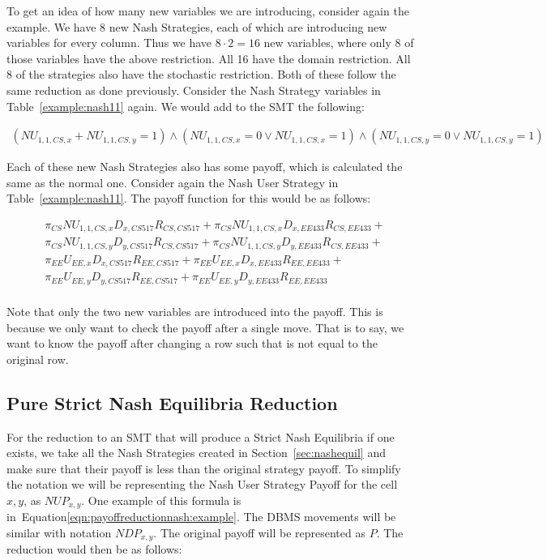 \documentclass{article}
\begin{document}
To get an idea of how many new variables we are introducing, consider again the example. We have 8 new Nash Strategies, each of which are introducing new variables for every column. Thus we have $8\cdot2=16$ new variables, where only 8 of those variables have the above restriction. All 16 have the domain restriction. All 8 of the strategies also have the stochastic restriction. Both of these follow the same reduction as done previously. Consider the Nash Strategy variables in Table~\ref{example:nash11} again. We would add to the SMT the following:

\begin{align}
(NU_{1,1,CS,x} + NU_{1,1,CS,y}=1)\land(NU_{1,1,CS,x}=0 \lor NU_{1,1,CS,x}=1)\land(NU_{1,1,CS,y}=0 \lor NU_{1,1,CS,y}=1)
\end{align}

Each of these new Nash Strategies also has some payoff, which is calculated the same as the normal one. Consider again the Nash User Strategy in Table~\ref{example:nash11}. The payoff function for this would be as follows:

\begin{align}
\label{eqn:payoffreductionnash:example}
&\pi_{CS}NU_{1,1,CS,x}D_{x,CS517}R_{CS,CS517} + \pi_{CS}NU_{1,1,CS,x}D_{x,EE433}R_{CS,EE433} +\\\nonumber
&\pi_{CS}NU_{1,1,CS,y}D_{y,CS517}R_{CS,CS517} + \pi_{CS}NU_{1,1,CS,y}D_{y,EE433}R_{CS,EE433}+\\\nonumber
&\pi_{EE}U_{EE,x}D_{x,CS517}R_{EE,CS517} + \pi_{EE}U_{EE,x}D_{x,EE433}R_{EE,EE433} +\\\nonumber
&\pi_{EE}U_{EE,y}D_{y,CS517}R_{EE,CS517} + \pi_{EE}U_{EE,y}D_{y,EE433}R_{EE,EE433}\\\nonumber
\end{align}

Note that only the two new variables are introduced into the payoff. This is because we only want to check the payoff after a single move. That is to say, we want to know the payoff after changing a row such that is not equal to the original row.

\subsection{Pure Strict Nash Equilibria Reduction}
\label{sec:strictnash}
For the reduction to an SMT that will produce a Strict Nash Equilibria if one exists, we take all the Nash Strategies created in Section~\ref{sec:nashequil} and make sure that their payoff is less than the original strategy payoff. To simplify the notation we will be representing the Nash User Strategy Payoff for the cell $x,y$, as $NUP_{x,y}$. One example of this formula is in~Equation\ref{eqn:payoffreductionnash:example}. The DBMS movements will be similar with notation $NDP_{x,y}$. The original payoff will be represented as $P$. The reduction would then be as follows:
\end{document}
